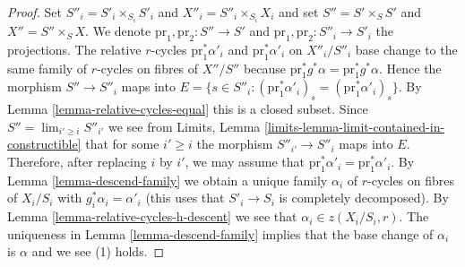 \documentclass{stacks-project}
\theoremstyle{plain}
\theoremstyle{definition}
\theoremstyle{remark}
\numberwithin{equation}{subsection}
\def\lim{\mathop{\mathrm{lim}}\nolimits}
\begin{document}
\begin{proof}
\medskip\noindent
Set $S''_i = S'_i \times_{S_i} S'_i$ and $X''_i = S''_i \times_{S_i} X_i$
and set $S'' = S' \times_S S'$ and $X'' = S'' \times_S X$.
We denote $\text{pr}_1, \text{pr}_2 : S'' \to S'$ and
$\text{pr}_1, \text{pr}_2 : S''_i \to S'_i$ the projections.
The relative $r$-cycles $\text{pr}_1^*\alpha'_i$ and $\text{pr}_1^*\alpha'_i$
on $X''_i/S''_i$ base change to the same family of $r$-cycles
on fibres of $X''/S''$ because
$\text{pr}_1^*g^*\alpha = \text{pr}_1^*g^*\alpha$.
Hence the morphism $S'' \to S''_i$ maps into $E =
\{s \in S''_i : (\text{pr}_1^*\alpha'_i)_s = (\text{pr}_1^*\alpha'_i)_s\}$.
By Lemma \ref{lemma-relative-cycles-equal} this is a closed subset.
Since $S'' = \lim_{i' \geq i} S''_{i'}$ we see from
Limits, Lemma
\ref{limits-lemma-limit-contained-in-constructible}
that for some $i' \geq i$ the morphism $S''_{i'} \to S''_i$
maps into $E$. Therefore, after replacing $i$ by $i'$, we may assume that
$\text{pr}_1^*\alpha'_i = \text{pr}_1^*\alpha'_i$.
By Lemma \ref{lemma-descend-family}
we obtain a unique family $\alpha_i$
of $r$-cycles on fibres of $X_i/S_i$
with $g_i^*\alpha_i = \alpha'_i$ (this uses that $S'_i \to S_i$
is completely decomposed).
By Lemma \ref{lemma-relative-cycles-h-descent}
we see that $\alpha_i \in z(X_i/S_i, r)$.
The uniqueness in Lemma \ref{lemma-descend-family} implies that the
base change of $\alpha_i$ is $\alpha$ and we see (1) holds.
\end{proof}
\end{document}
